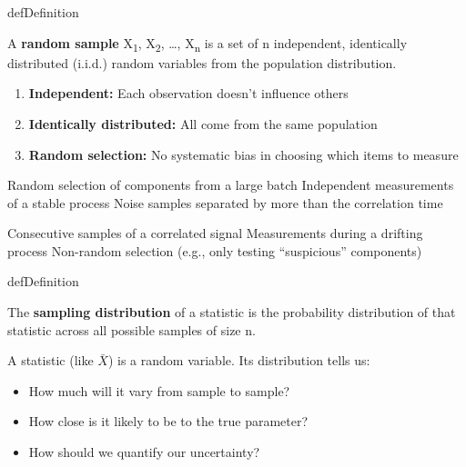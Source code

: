 
\begin{PSbox}[unbreakable]{def}{Definition}

A \textbf{random sample} X\textsubscript{1}, X\textsubscript{2}, …, X\textsubscript{n} is a set of n independent, identically distributed (i.i.d.) random variables from the population distribution.

\end{PSbox}


\begin{enumerate}
\def\labelenumi{\arabic{enumi}.}
\tightlist
\item
  \textbf{Independent:} Each observation doesn’t influence others
\item
  \textbf{Identically distributed:} All come from the same population
\item
  \textbf{Random selection:} No systematic bias in choosing which items to measure
\end{enumerate}


\PSyes{} Random selection of components from a large batch\PSbr{}\PSyes{} Independent measurements of a stable process\PSbr{}\PSyes{} Noise samples separated by more than the correlation time


\PSno{} Consecutive samples of a correlated signal\PSbr{}\PSno{} Measurements during a drifting process\PSbr{}\PSno{} Non-random selection (e.g., only testing ``suspicious'' components)


\begin{PSbox}[unbreakable]{def}{Definition}

The \textbf{sampling distribution} of a statistic is the probability distribution of that statistic across all possible samples of size n.

\end{PSbox}


A statistic (like \ensuremath{\bar{X}}) is a random variable. Its distribution tells us:

\begin{itemize}
\tightlist
\item
  How much will it vary from sample to sample?
\item
  How close is it likely to be to the true parameter?
\item
  How should we quantify our uncertainty?
\end{itemize}

